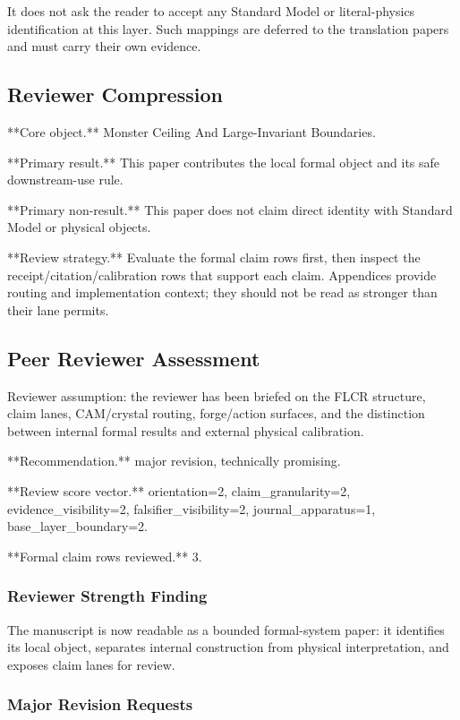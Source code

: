 \documentclass[11pt]{article}
\begin{document}
It does not ask the reader to accept any Standard Model or literal-physics identification at this layer. Such mappings are deferred to the translation papers and must carry their own evidence.

\subsection*{Reviewer Compression}

**Core object.** Monster Ceiling And Large-Invariant Boundaries.

**Primary result.** This paper contributes the local formal object and its safe downstream-use rule.

**Primary non-result.** This paper does not claim direct identity with Standard Model or physical objects.

**Review strategy.** Evaluate the formal claim rows first, then inspect the receipt/citation/calibration rows that support each claim. Appendices provide routing and implementation context; they should not be read as stronger than their lane permits.

\subsection*{Peer Reviewer Assessment}

Reviewer assumption: the reviewer has been briefed on the FLCR structure, claim lanes, CAM/crystal routing, forge/action surfaces, and the distinction between internal formal results and external physical calibration.

**Recommendation.** major revision, technically promising.

**Review score vector.** orientation=2, claim\_granularity=2, evidence\_visibility=2, falsifier\_visibility=2, journal\_apparatus=1, base\_layer\_boundary=2.

**Formal claim rows reviewed.** 3.

\subsubsection*{Reviewer Strength Finding}

The manuscript is now readable as a bounded formal-system paper: it identifies its local object, separates internal construction from physical interpretation, and exposes claim lanes for review.

\subsubsection*{Major Revision Requests}
\end{document}
